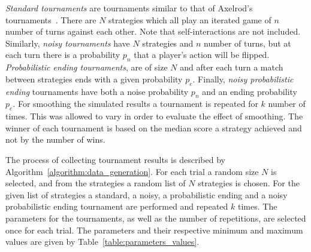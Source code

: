 \textit{Standard tournaments} are tournaments similar to that of Axelrod's
tournaments~\cite{Axelrod1980a}. There are \(N\) strategies which all play an iterated
game of \(n\) number of turns against each other. Note that self-interactions
are not included. Similarly, \textit{noisy
tournaments} have \(N\) strategies and \(n\) number of turns, but at each turn
there is a probability \(p_n\) that a player's action will be flipped.
\textit{Probabilistic ending tournaments}, are of size \(N\) and after each turn
a match between strategies ends with a given probability \(p_e\). Finally,
\textit{noisy probabilistic ending} tournaments have both a noise probability
\(p_n\) and an ending probability \(p_e\). For smoothing the simulated results a
tournament is repeated for \(k\) number of times. This was allowed to vary
in order to evaluate the effect of smoothing. The winner of each tournament
is based on the median score a strategy achieved and not by the number of wins.

The process of collecting tournament results is described by
Algorithm~\ref{algorithm:data_generation}. For each trial a random size \(N\) is
selected, and from the \numberofstrategies strategies a random list of \(N\) strategies is
chosen. For the given list of strategies a standard, a noisy, a probabilistic
ending and a noisy probabilistic ending tournament are performed and repeated
\(k\) times. The parameters for the tournaments, as well as the number of
repetitions, are selected once for each trial. The parameters and their
respective minimum and maximum values are given by
Table~\ref{table:parameters_values}.

\begin{table}[!htbp]
    \begin{center}
    \end{center}
    \caption{Data collection; parameters' values}
    \label{table:parameters_values}
\end{table}

